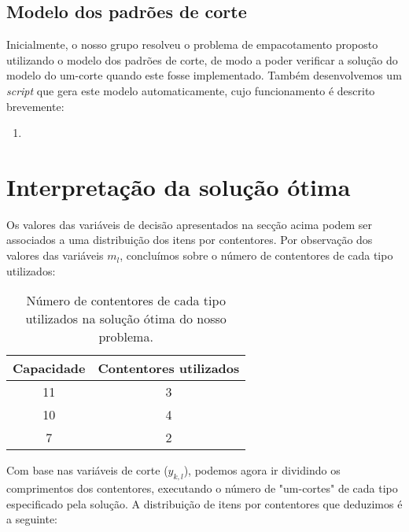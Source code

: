 \documentclass[12pt, a4paper, titlepage]{article}
\begin{document}

\subsection{Modelo dos padrões de corte}

Inicialmente, o nosso grupo resolveu o problema de empacotamento proposto utilizando o modelo dos
padrões de corte, de modo a poder verificar a solução do modelo do um-corte quando este fosse
implementado. Também desenvolvemos um \emph{script} que gera este modelo automaticamente, cujo
funcionamento é descrito brevemente:

\begin{enumerate}
	\item %
\end{enumerate}

\section{Interpretação da solução ótima}

Os valores das variáveis de decisão apresentados na secção acima podem ser associados a uma
distribuição dos itens por contentores. Por observação dos valores das variáveis $m_l$, concluímos
sobre o número de contentores de cada tipo utilizados:

\begin{table}[H]
    \begin{center}
        \begin{tabular}{c|c}
            Capacidade & Contentores utilizados \\
            \hline
            11         & 3 \\
            10         & 4 \\
            7          & 2
        \end{tabular}
    \end{center}
    \caption{Número de contentores de cada tipo utilizados na solução ótima do nosso problema.}
\end{table}

Com base nas variáveis de corte ($y_{k, l}$), podemos agora ir dividindo os comprimentos dos
contentores, executando o número de "um-cortes"{} de cada tipo especificado pela solução. A
distribuição de itens por contentores que deduzimos é a seguinte:
\end{document}
